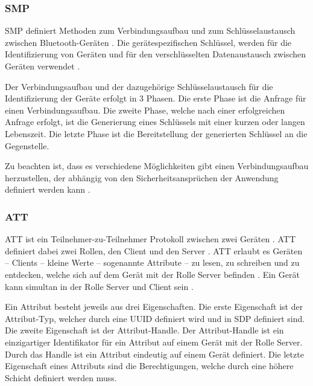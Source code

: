 \subsubsection{\acf{SMP}}
\ac{SMP} definiert Methoden zum Verbindungsaufbau und zum Schlüsselaustausch zwischen Bluetooth-Geräten \cite[S.~1554]{bluetoothCore}. Die gerätespezifischen Schlüssel, werden für die Identifizierung von Geräten und für den verschlüsselten Datenaustausch zwischen Geräten verwendet \cites[S.~1556]{bluetoothCore}[S.~18]{siliconBLE}.

Der Verbindungsaufbau und der dazugehörige Schlüsselaustausch für die Identifizierung der Geräte erfolgt in 3 Phasen. Die erste Phase ist die Anfrage für einen Verbindungsaufbau. Die zweite Phase, welche nach einer erfolgreichen Anfrage erfolgt, ist die Generierung eines Schlüssels mit einer kurzen oder langen Lebenszeit. Die letzte Phase ist die Bereitstellung der generierten Schlüssel an die Gegenstelle. \cite[S.~1556]{bluetoothCore}

Zu beachten ist, dass es verschiedene Möglichkeiten gibt einen Verbindungsaufbau herzustellen, der abhängig von den Sicherheitsansprüchen der Anwendung definiert werden kann \cite[S.~18]{siliconBLE}.

\subsubsection{\acf{ATT}}
\ac{ATT} ist ein Teilnehmer-zu-Teilnehmer Protokoll zwischen zwei Geräten \cite[S.~206]{bluetoothCore}. \ac{ATT} definiert dabei zwei Rollen, den Client und den Server \cite[S.~1410]{bluetoothCore}. \ac{ATT} erlaubt es Geräten -- Clients -- kleine Werte -- sogenannte Attribute \cite[S.~279]{bluetoothCore} -- zu lesen, zu schreiben und zu entdecken, welche sich auf dem Gerät mit der Rolle Server befinden \cite[S.~1409]{bluetoothCore}. Ein Gerät kann simultan in der Rolle Server und Client sein \cite[S.~279]{bluetoothCore}.

Ein Attribut besteht jeweils aus drei Eigenschaften. Die erste Eigenschaft ist der Attribut-Typ, welcher durch eine \acf{UUID} definiert wird und in \ac{SDP} definiert sind. Die zweite Eigenschaft ist der Attribut-Handle. Der Attribut-Handle ist ein einzigartiger Identifikator für ein Attribut auf einem Gerät mit der Rolle Server. Durch das Handle ist ein Attribut eindeutig auf einem Gerät definiert. Die letzte Eigenschaft eines Attributs sind die Berechtigungen, welche durch eine höhere Schicht definiert werden muss. \cite[S.~1410ff.]{bluetoothCore}

